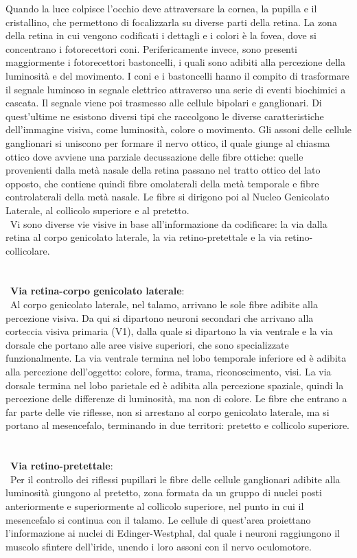 Quando la luce colpisce l’occhio deve attraversare la cornea, la pupilla e il cristallino, che permettono di focalizzarla su diverse parti della retina. La zona della retina in cui vengono codificati i dettagli e i colori è la fovea, dove si concentrano i fotorecettori coni. Perifericamente invece, sono presenti maggiormente i fotorecettori bastoncelli, i quali sono adibiti alla percezione della luminosità e del movimento. I coni e i bastoncelli hanno il compito di trasformare il segnale luminoso in segnale elettrico attraverso una serie di eventi biochimici a cascata. Il segnale viene poi trasmesso alle cellule bipolari e ganglionari. Di quest'ultime ne esistono diversi tipi che raccolgono le diverse caratteristiche dell’immagine visiva, come luminosità, colore o movimento. Gli assoni delle cellule ganglionari si uniscono per formare il nervo ottico, il quale giunge al chiasma ottico dove avviene una parziale decussazione delle fibre ottiche: quelle provenienti dalla metà nasale della retina passano nel tratto ottico del lato opposto, che contiene quindi fibre omolaterali della metà temporale e fibre controlaterali della metà nasale. Le fibre si dirigono poi al Nucleo Genicolato Laterale, al collicolo superiore e al pretetto. 
\\\
Vi sono diverse vie visive in base all’informazione da codificare: la via dalla retina al corpo genicolato laterale, la via retino-pretettale e la via retino-collicolare.
\\\ \\\ \\\ 
\textbf{Via retina-corpo genicolato laterale}: 
\\\
Al corpo genicolato laterale, nel talamo, arrivano le sole fibre adibite alla percezione visiva. Da qui si dipartono neuroni secondari che arrivano alla corteccia visiva primaria (V1), dalla quale si dipartono la via ventrale e la via dorsale che portano alle aree visive superiori, che sono specializzate funzionalmente. La via ventrale termina nel lobo temporale inferiore ed è adibita alla percezione dell’oggetto: colore, forma, trama, riconoscimento, visi. La via dorsale termina nel lobo parietale ed è adibita alla percezione spaziale, quindi la percezione delle differenze di luminosità, ma non di colore.
Le fibre che entrano a far parte delle vie riflesse, non si arrestano al corpo genicolato laterale, ma si portano al mesencefalo, terminando in due territori: pretetto e collicolo superiore.
\\\ \\\ \\\
\textbf{Via retino-pretettale}: 
\\\
Per il controllo dei riflessi pupillari le fibre delle cellule ganglionari adibite alla luminosità giungono al pretetto, zona formata da un gruppo di nuclei posti anteriormente e superiormente al collicolo superiore, nel punto in cui il mesencefalo si continua con il talamo. Le cellule di quest’area proiettano l’informazione ai nuclei di Edinger-Westphal, dal quale i neuroni raggiungono il muscolo sfintere dell’iride, unendo i loro assoni con il nervo oculomotore.

